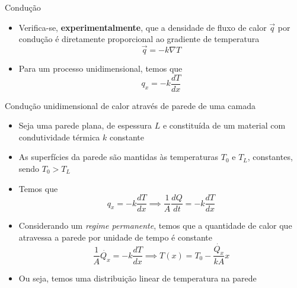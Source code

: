 \documentclass[t,%
brazilian,%
11pt,%
aspectratio=169,%
table%
]{beamer}
\begin{document}
\begin{frame}{Condução}
    \begin{itemize}
        \item Verifica-se, \textbf{experimentalmente}, que a densidade de fluxo
            de calor \(\vec{q}\) por condução é diretamente proporcional ao gradiente de
            temperatura
            \[
                \vec{q} = -k \nabla T
            \]
        \item Para um processo unidimensional, temos que
            \[
                q_x = -k \frac{dT}{dx}
            \]

    \end{itemize}
\end{frame}

\begin{frame}{Condução unidimensional de calor através de parede de uma camada}
    \begin{itemize}
        \item Seja uma parede plana, de espessura \(L\) e constituída de um
            material com condutividade térmica \(k\) constante
            \begin{center}
            \end{center}
        \item As superfícies da parede são mantidas às temperaturas \(T_0\) e
            \(T_L\), constantes, sendo \(T_0 > T_L\)
    \end{itemize}
\end{frame}

\begin{frame}
    \begin{itemize}
        \item Temos que 
            \[
                q_x = -k \frac{dT}{dx} \implies \frac{1}{A}\frac{dQ}{dt}=-k \frac{dT}{dx}
            \]
        \item Considerando um \textit{regime permanente}, temos que a quantidade de calor
            que atravessa a parede por unidade de tempo é constante 
            \[
                \frac{1}{A}\dot{Q_x}=-k \frac{dT}{dx} \implies
                T(x) = T_0 - \frac{\dot{Q_x}}{kA} x
            \]
        \item Ou seja, temos uma distribuição linear de temperatura na parede
    \end{itemize}
\end{frame}
\end{document}
